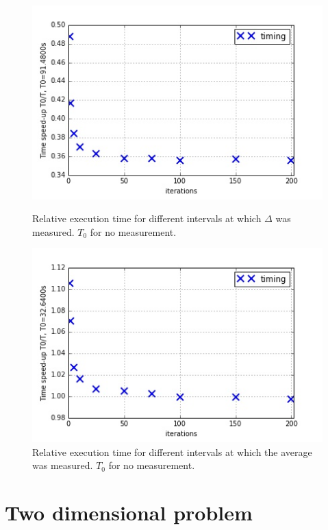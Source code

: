\documentclass[11pt]{article}
\begin{document}
	\begin{figure}[ht]	
		\centering
		\begin{minipage}[b]{.5\textwidth}
			\centering
			\includegraphics[width=\linewidth]{serialvs4.jpeg}
			\caption[short]{Relative execution time for different intervals at which $\Delta$ was measured. $T_0$ for no measurement.}\label{serial4}
		\end{minipage}%
		\begin{minipage}[b]{.5\textwidth}
			\centering
			\includegraphics[width=\linewidth]{serialvs5.jpeg}
			\caption[short]{Relative execution time for different intervals at which the average was measured. $T_0$ for no measurement.}\label{serial5}
		\end{minipage}%
	\end{figure}

	\section{Two dimensional problem}
	
\end{document}
